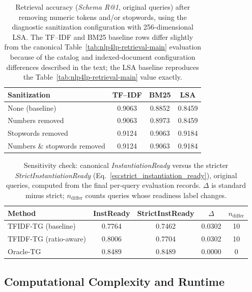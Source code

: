 \documentclass[pdflatex,sn-basic,Numbered]{sn-jnl}
\begin{document}
\begin{table}[t]
\centering
\caption{Retrieval accuracy (\textit{Schema R@1}, original queries) after removing numeric tokens and/or stopwords, using the diagnostic sanitization configuration with 256-dimensional LSA. The TF--IDF and BM25 baseline rows differ slightly from the canonical Table~\ref{tab:nlp4lp-retrieval-main} evaluation because of the catalog and indexed-document configuration differences described in the text; the LSA baseline reproduces the Table~\ref{tab:nlp4lp-retrieval-main} value exactly.}
\label{tab:nlp4lp-overlap}
\small
\begin{tabular}{lccc}
  \toprule
  Sanitization & TF--IDF & BM25 & LSA \\
  \midrule
  None (baseline)               & 0.9063 & 0.8852 & 0.8459 \\
  Numbers removed               & 0.9063 & 0.8973 & 0.8459 \\
  Stopwords removed             & 0.9124 & 0.9063 & 0.9184 \\
  Numbers \& stopwords removed  & 0.9124 & 0.9063 & 0.9184 \\
  \bottomrule
\end{tabular}
\end{table}

\begin{table}[t]
\centering
\caption{Sensitivity check: canonical \textit{InstantiationReady} versus the stricter \textit{StrictInstantiationReady} (Eq.~\eqref{eq:strict_instantiation_ready}), original queries, computed from the final per-query evaluation records. $\Delta$ is standard minus strict; $n_{\text{differ}}$ counts queries whose readiness label changes.}
\label{tab:strict-instready}
\small
\begin{tabular}{lcccc}
  \toprule
  Method & InstReady & StrictInstReady & $\Delta$ & $n_{\text{differ}}$ \\
  \midrule
  TFIDF-TG (baseline) & 0.7764 & 0.7462 & 0.0302 & 10 \\
  TFIDF-TG (ratio-aware) & 0.8006 & 0.7704 & 0.0302 & 10 \\
  Oracle-TG & 0.8489 & 0.8489 & 0.0000 & 0 \\
  \bottomrule
\end{tabular}
\end{table}

\subsection{Computational Complexity and Runtime}
\label{subsec:exp_runtime}
\end{document}
